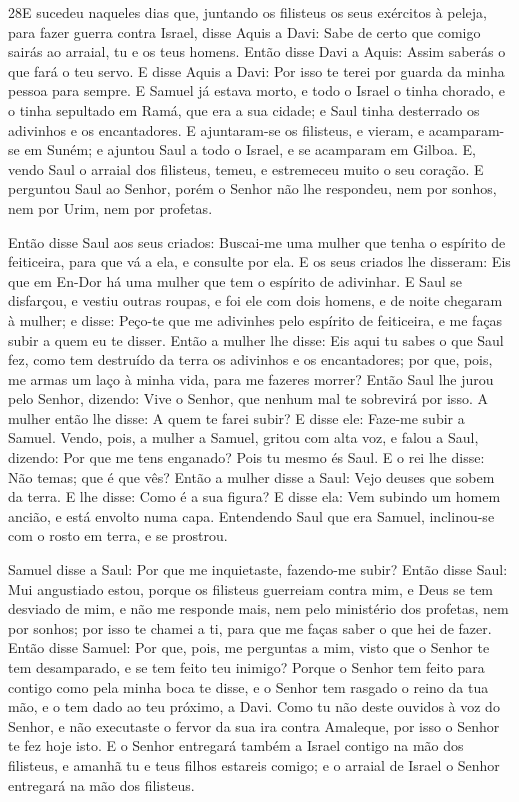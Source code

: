 \medskip

\lettrine{28} E sucedeu naqueles dias que, juntando os
filisteus os seus exércitos à peleja, para fazer guerra contra
Israel, disse Aquis a Davi: Sabe de certo que comigo sairás ao
arraial, tu e os teus homens. Então disse Davi a Aquis: Assim
saberás o que fará o teu servo. E disse Aquis a Davi: Por isso te
terei por guarda da minha pessoa para sempre. E Samuel já estava
morto, e todo o Israel o tinha chorado, e o tinha sepultado em Ramá,
que era a sua cidade; e Saul tinha desterrado os adivinhos e os
encantadores. E ajuntaram-se os filisteus, e vieram, e
acamparam-se em Suném; e ajuntou Saul a todo o Israel, e se
acamparam em Gilboa. E, vendo Saul o arraial dos filisteus,
temeu, e estremeceu muito o seu coração. E perguntou Saul ao
Senhor, porém o Senhor não lhe respondeu, nem por sonhos, nem por
Urim, nem por profetas.

Então disse Saul aos seus criados: Buscai-me uma mulher que tenha
o espírito de feiticeira, para que vá a ela, e consulte por ela. E
os seus criados lhe disseram: Eis que em En-Dor há uma mulher que
tem o espírito de adivinhar. E Saul se disfarçou, e vestiu
outras roupas, e foi ele com dois homens, e de noite chegaram à
mulher; e disse: Peço-te que me adivinhes pelo espírito de
feiticeira, e me faças subir a quem eu te disser. Então a mulher
lhe disse: Eis aqui tu sabes o que Saul fez, como tem destruído da
terra os adivinhos e os encantadores; por que, pois, me armas um
laço à minha vida, para me fazeres morrer? Então Saul lhe
jurou pelo Senhor, dizendo: Vive o Senhor, que nenhum mal te
sobrevirá por isso. A mulher então lhe disse: A quem te farei
subir? E disse ele: Faze-me subir a Samuel. Vendo, pois, a
mulher a Samuel, gritou com alta voz, e falou a Saul, dizendo: Por
que me tens enganado? Pois tu mesmo és Saul. E o rei lhe
disse: Não temas; que é que vês? Então a mulher disse a Saul: Vejo
deuses que sobem da terra. E lhe disse: Como é a sua figura?
E disse ela: Vem subindo um homem ancião, e está envolto numa capa.
Entendendo Saul que era Samuel, inclinou-se com o rosto em terra, e
se prostrou.

Samuel disse a Saul: Por que me inquietaste, fazendo-me subir?
Então disse Saul: Mui angustiado estou, porque os filisteus
guerreiam contra mim, e Deus se tem desviado de mim, e não me
responde mais, nem pelo ministério dos profetas, nem por sonhos; por
isso te chamei a ti, para que me faças saber o que hei de fazer.
Então disse Samuel: Por que, pois, me perguntas a mim, visto
que o Senhor te tem desamparado, e se tem feito teu inimigo?
Porque o Senhor tem feito para contigo como pela minha boca
te disse, e o Senhor tem rasgado o reino da tua mão, e o tem dado ao
teu próximo, a Davi. Como tu não deste ouvidos à voz do
Senhor, e não executaste o fervor da sua ira contra Amaleque, por
isso o Senhor te fez hoje isto. E o Senhor entregará também a
Israel contigo na mão dos filisteus, e amanhã tu e teus filhos
estareis comigo; e o arraial de Israel o Senhor entregará na mão dos
filisteus.

